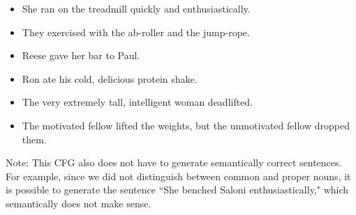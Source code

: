 \documentclass{article}
\begin{document}
\begin{tcolorbox}[enhanced,interior style={top color=Dandelion!20,bottom color=Dandelion!30}]
\begin{itemize}
\begin{itemize}
                \item She ran on the treadmill quickly and enthusiastically.
                \item They exercised with the ab-roller and the jump-rope.
                \item Reese gave her bar to Paul.
                \item Ron ate his cold, delicious protein shake.
                \item The very extremely tall, intelligent woman deadlifted.
                \item The motivated fellow lifted the weights, but the unmotivated fellow dropped them.
            \end{itemize}

            Note: This CFG also does not have to generate semantically correct sentences. For example, since we did not distinguish between common and proper nouns, it is possible to generate the sentence ``She benched Saloni enthusiastically," which semantically does not make sense.
        \end{itemize}
\end{tcolorbox}






\end{document}
